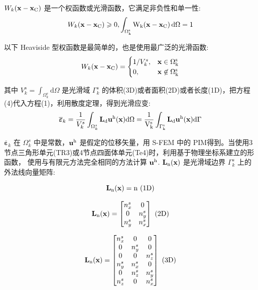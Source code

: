 \documentclass[12pt,a4paper]{article}
\begin{document}
$W_k (\rm\textbf{x}-\rm\textbf{x}_C)$ 是一个权函数或光滑函数，它满足非负性和单一性:
\begin{equation}
W_k (\rm\textbf{x}-\rm\textbf{x}_C)\geqslant 0,\int_{\Omega ^s_k}^{}W_k (\rm\textbf{x}-
\rm\textbf{x}_C)\,\mathrm{d}\Omega=1
\end{equation}

以下 Heaviside 型权函数是最简单的，也是使用最广泛的光滑函数:
\begin{equation}
W_k (\rm\textbf{x}-\rm\textbf{x}_C)=
\begin{cases}
1/V^s_k, & \rm\textbf{x}\in \Omega ^s_k\\
0, & \rm\textbf{x}\not\in \Omega ^s_k
\end{cases}
\end{equation}

其中 $V^s_k=\int_{\Omega ^s_k}^{}\mathrm{d}\Omega$ 是光滑域 $\Gamma ^s _k$ 的体积(3D)或者面积(2D)或者长度(1D)，把方程(4)代入方程(1)，利用散度定理，得到光滑应变:
\begin{equation}
\overline{\boldsymbol{\varepsilon}}_k =\frac{1}{V^s_k}\int_{\Omega ^s_k}^{} \rm\textbf{L}_d \rm\textbf{u}^h (\rm\textbf{x}) \mathrm{d}\Omega=\frac{1}{V^s_k}\int_{\Gamma ^s_k}^{} \rm\textbf{L}_d \rm\textbf{u}^h (\rm\textbf{x})\mathrm{d}\Gamma
\end{equation}

$\overline{\boldsymbol{\varepsilon}}_k$ 在 $\Omega ^s_k$ 中是常数，$\rm\textbf{u}^h$ 是假定的位移矢量，用 S-FEM 中的 PIM得到。当使用3节点三角形单元(TR3)或4节点四面体单元(Te4)时，利用基于物理坐标系建立的形函数，
使用与有限元方法完全相同的方法计算 $\rm\textbf{u}^h$. $\rm\textbf{L}_n (\rm\textbf{x})$ 是光滑域边界 $\Gamma ^s _k$ 上的外法线向量矩阵:

$$
\rm\textbf{L}_n (\rm\textbf{x})=n~(1D)
$$

$$
\rm\textbf{L}_n (\rm\textbf{x})=
\begin{bmatrix}
n^s_x & 0 \\
0 & n^s_y \\
n^s_y & n^s_x\\
\end{bmatrix}~(2D)
$$

\begin{equation}
\rm\textbf{L}_n (\rm\textbf{x})=
\begin{bmatrix}
n^s_x & 0 & 0 \\
0 & n^s_y & 0 \\
0 & 0 & n^s_z \\
n^s_y & n^s_x & 0 \\
0 & n^s_z & n^s_y \\
n^s_z & 0 & n^s_x \\
\end{bmatrix}~(3D)
\end{equation}
\end{document}

